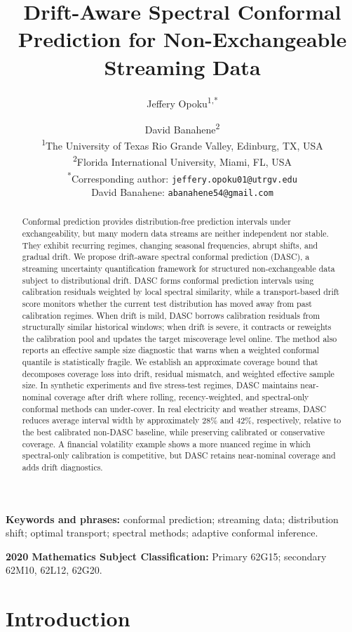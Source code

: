 \documentclass[11pt]{article}
\title{Drift-Aware Spectral Conformal Prediction for Non-Exchangeable Streaming Data}
\author{
Jeffery Opoku\textsuperscript{1,*}
\and
David Banahene\textsuperscript{2}
\\[0.5em]
\textsuperscript{1}The University of Texas Rio Grande Valley, Edinburg, TX, USA\\
\textsuperscript{2}Florida International University, Miami, FL, USA\\
\textsuperscript{*}Corresponding author: \texttt{jeffery.opoku01@utrgv.edu}\\
David Banahene: \texttt{abanahene54@gmail.com}
}
\date{}
\begin{document}
\maketitle

\begin{abstract}
Conformal prediction provides distribution-free prediction intervals under exchangeability, but many modern data streams are neither independent nor stable. They exhibit recurring regimes, changing seasonal frequencies, abrupt shifts, and gradual drift. We propose drift-aware spectral conformal prediction (DASC), a streaming uncertainty quantification framework for structured non-exchangeable data subject to distributional drift. DASC forms conformal prediction intervals using calibration residuals weighted by local spectral similarity, while a transport-based drift score monitors whether the current test distribution has moved away from past calibration regimes. When drift is mild, DASC borrows calibration residuals from structurally similar historical windows; when drift is severe, it contracts or reweights the calibration pool and updates the target miscoverage level online. The method also reports an effective sample size diagnostic that warns when a weighted conformal quantile is statistically fragile. We establish an approximate coverage bound that decomposes coverage loss into drift, residual mismatch, and weighted effective sample size. In synthetic experiments and five stress-test regimes, DASC maintains near-nominal coverage after drift where rolling, recency-weighted, and spectral-only conformal methods can under-cover. In real electricity and weather streams, DASC reduces average interval width by approximately 28\% and 42\%, respectively, relative to the best calibrated non-DASC baseline, while preserving calibrated or conservative coverage. A financial volatility example shows a more nuanced regime in which spectral-only calibration is competitive, but DASC retains near-nominal coverage and adds drift diagnostics.
\end{abstract}

\noindent\textbf{Keywords and phrases:} conformal prediction; streaming data; distribution shift; optimal transport; spectral methods; adaptive conformal inference.

\medskip
\noindent\textbf{2020 Mathematics Subject Classification:} Primary 62G15; secondary 62M10, 62L12, 62G20.

\section{Introduction}
\end{document}
